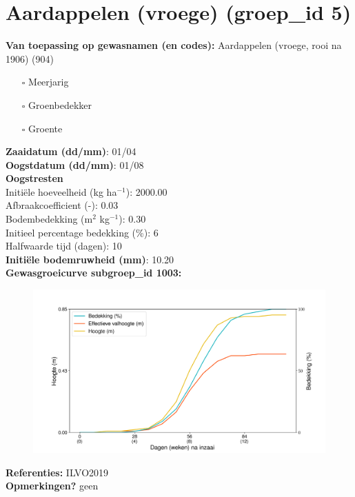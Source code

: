 \documentclass{article}
\begin{document}
 \section{Aardappelen (vroege) (groep\_id 5)} 
 \textbf{Van toepassing op gewasnamen (en codes):} Aardappelen (vroege, rooi na 1906) (904) 
 \begin{multicols}{3} \begin{itemize} \item[$\square$] Meerjarig \item[$\square$] Groenbedekker \item[$\square$] Groente \end{itemize} \end{multicols} 
  \textbf{Zaaidatum (dd/mm)}: 01/04  \vspace{0.10cm} \\ 
  \textbf{Oogstdatum (dd/mm)}: 01/08  \vspace{0.10cm} \\ 
  \textbf{Oogstresten} \vspace{0.05cm} \\ 
  \tab Initi\"{e}le hoeveelheid (kg ha$^{-1}$): 2000.00 \vspace{0.05cm} \\ 
  \tab Afbraakcoefficient (-): 0.03 \vspace{0.05cm} \\ 
  \tab Bodembedekking (m$^2$ kg$^{-1}$): 0.30 \vspace{0.05cm} \\ 
  \tab Initieel percentage bedekking (\%): 6 \vspace{0.05cm} \\ 
  \tab Halfwaarde tijd (dagen): 10 \vspace{0.05cm} \\ 
  \textbf{Initi\"{e}le bodemruwheid (mm)}: 10.20 \vspace{0.05cm} \\ 
  \textbf{Gewasgroeicurve subgroep\_id 1003:} 
 \begin{center} \begin{figure}[H] \includegraphics[width=12.5cm]{temp/1003.png} \end{figure} \end{center} 
  \textbf{Referenties:} ILVO2019 \vspace{0.10cm} \\ 
  \textbf{Opmerkingen?} geen \vspace{0.10cm} \\ 
 \newpage 
\end{document}
